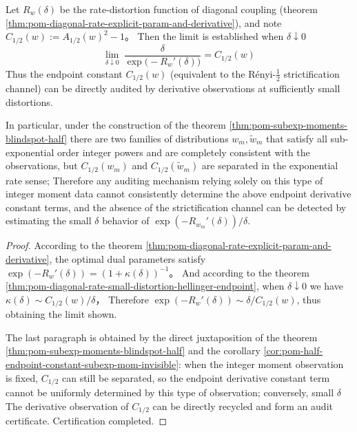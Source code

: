 \begin{proposition}\label{prop:pom-strictification-missing-auditable-by-rate-derivative}
Let \(R_w(\delta)\) be the rate-distortion function of diagonal coupling (theorem \ref{thm:pom-diagonal-rate-explicit-param-and-derivative}), and note
\(
C_{1/2}(w):=A_{1/2}(w)^2-1
\)。
Then the limit is established when \(\delta\downarrow 0\)
\[
\boxed{\;
\lim_{\delta\downarrow 0}\ \frac{\delta}{\exp\bigl(-R_w'(\delta)\bigr)}=C_{1/2}(w)\;}
\]
Thus the endpoint constant \(C_{1/2}(w)\) (equivalent to the Rényi-\(\tfrac12\) strictification channel) can be directly audited by derivative observations at sufficiently small distortions.
\par
In particular, under the construction of the theorem \ref{thm:pom-subexp-moments-blindspot-half} there are two families of distributions \(w_m,\widetilde w_m\) that satisfy all sub-exponential order integer powers and are completely consistent with the observations, but \(C_{1/2}(w_m)\) and \(C_{1/2}(\widetilde w_m)\) are separated in the exponential rate sense;
Therefore any auditing mechanism relying solely on this type of integer moment data cannot consistently determine the above endpoint derivative constant terms, and the absence of the strictification channel can be detected by estimating the small \(\delta\) behavior of \(\exp(-R_{w_m}'(\delta))/\delta\).
\end{proposition}
\begin{proof}
According to the theorem \ref{thm:pom-diagonal-rate-explicit-param-and-derivative}, the optimal dual parameters satisfy
\(
\exp(-R_w'(\delta))=(1+\kappa(\delta))^{-1}
\)。
And according to the theorem \ref{thm:pom-diagonal-rate-small-distortion-hellinger-endpoint}, when \(\delta\downarrow 0\) we have
\(
\kappa(\delta)\sim C_{1/2}(w)/\delta
\)，
Therefore
\(
\exp(-R_w'(\delta))\sim \delta/C_{1/2}(w)
\), thus obtaining the limit shown.
\par
The last paragraph is obtained by the direct juxtaposition of the theorem \ref{thm:pom-subexp-moments-blindspot-half} and the corollary \ref{cor:pom-half-endpoint-constant-subexp-mom-invisible}: when the integer moment observation is fixed, \(C_{1/2}\) can still be separated, so the endpoint derivative constant term cannot be uniformly determined by this type of observation; conversely, small \(\delta\) The derivative observation of \(C_{1/2}\) can be directly recycled and form an audit certificate. Certification completed.
\end{proof}

